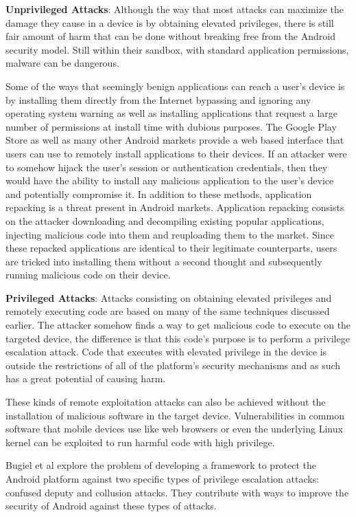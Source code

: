 \documentclass[conference]{IEEEtran}
\begin{document}
\textbf{Unprivileged Attacks}: Although the way that most attacks can maximize the damage they cause in a device is by obtaining elevated privileges, there is still fair amount of harm that can be done without breaking free from the Android security model. Still within their sandbox, with standard application permissions, malware can be dangerous. 

Some of the ways that seemingly benign applications can reach a user's device is by installing them directly from the Internet bypassing and ignoring any operating system warning as well as installing applications that request a large number of permissions at install time with dubious purposes. The Google Play Store as well as many other Android markets provide a web based interface that users can use to remotely install applications to their devices. If an attacker were to somehow hijack the user's session or authentication credentials, then they would have the ability to install any malicious application to the user's device and potentially compromise it. In addition to these methods, application repacking is a threat present in Android markets. Application repacking consists on the attacker downloading and decompiling existing popular applications, injecting malicious code into them and reuploading them to the market. Since these repacked applications are identical to their legitimate counterparts, users are tricked into installing them without a second thought and subsequently running malicious code on their device.

\textbf{Privileged Attacks}: Attacks consisting on obtaining elevated privileges and remotely executing code are based on many of the same techniques discussed earlier. The attacker somehow finds a way to get malicious code to execute on the targeted device, the difference is that this code's purpose is to perform a privilege escalation attack. Code that executes with elevated privilege in the device is outside the restrictions of all of the platform's security mechanisms and as such has a great potential of causing harm.

These kinds of remote exploitation attacks can also be achieved without the installation of malicious software in the target device. Vulnerabilities in common software that mobile devices use like web browsers or even the underlying Linux kernel can be exploited to run harmful code with high privilege.

Bugiel et al \cite{bugiel2012towards} explore the problem of developing a framework to protect the Android platform against two specific types of privilege escalation attacks: confused deputy and collusion attacks. They contribute with ways to improve the security of Android against these types of attacks.
\end{document}
